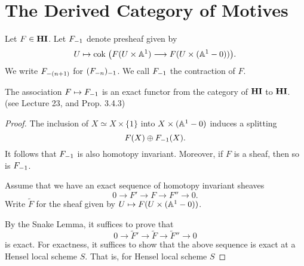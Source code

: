 \newpage
\section{The Derived Category of Motives}\label{sect_dmeff_and_dm}


\begin{defn}
Let $F \in \HI$. Let $\RHI{F}$ denote presheaf given by
\[
U \mapsto \cok\big( F(U \times \A^1) \to 
   F(U \times (\A^1 - 0))\big).
\]
We write $\RHI[(n + 1)]{F}$ for $\RHI{(\RHI[n]{F})}$. We call 
$\RHI{F}$ the contraction of $F$.
\end{defn}

\begin{prop}\label{prop_contract_is_exact}
The association $F \mapsto \RHI{F}$ is an exact functor from
the category of $\HI$ to $\HI$. (see \cite{MVW} Lecture 23, and
\cite{DegGenMot} Prop. 3.4.3)
\end{prop}
\begin{proof}
The inclusion of $X \simeq X \times \{1\}$ into $X \times 
(\A^1 - 0)$ induces a splitting
\[
F(X) \oplus \RHI{F}(X).
\]
It follows that $\RHI{F}$ is also homotopy invariant. Moreover,
if $F$ is a sheaf, then so is $\RHI{F}$.

Assume that we have an exact sequence of homotopy invariant 
sheaves
\[
0 \to F' \to F \to F'' \to 0.
\]
Write $\tilde{F}$ for the sheaf given by $U \mapsto F(U \times 
(\A^1 - 0))$.

By the Snake Lemma, it suffices to prove that
\[
0 \to \tilde{F}' \to \tilde{F} \to \tilde{F}'' \to 0
\]
is exact. For exactness, it suffices to show that the above 
sequence is exact at a Hensel local scheme $S$. That is, for
Hensel local scheme $S$

\end{proof}
